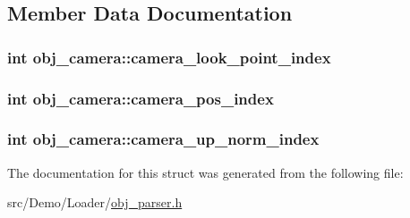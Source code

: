 \subsection{Member Data Documentation}
\hypertarget{structobj__camera_ad795a90bb5ddd7298fac17af40317881}{
\subsubsection[{camera\+\_\+look\+\_\+point\+\_\+index}]{\setlength{\rightskip}{0pt plus 5cm}int obj\+\_\+camera\+::camera\+\_\+look\+\_\+point\+\_\+index}}\label{structobj__camera_ad795a90bb5ddd7298fac17af40317881}
\hypertarget{structobj__camera_a02c5e1c127fc81b0377d773572d82a8a}{
\subsubsection[{camera\+\_\+pos\+\_\+index}]{\setlength{\rightskip}{0pt plus 5cm}int obj\+\_\+camera\+::camera\+\_\+pos\+\_\+index}}\label{structobj__camera_a02c5e1c127fc81b0377d773572d82a8a}
\hypertarget{structobj__camera_a2d8ae90adcf03df3b2b28c3c13e1da5d}{
\subsubsection[{camera\+\_\+up\+\_\+norm\+\_\+index}]{\setlength{\rightskip}{0pt plus 5cm}int obj\+\_\+camera\+::camera\+\_\+up\+\_\+norm\+\_\+index}}\label{structobj__camera_a2d8ae90adcf03df3b2b28c3c13e1da5d}


The documentation for this struct was generated from the following file\+:\begin{DoxyCompactItemize}
\item 
src/\+Demo/\+Loader/\hyperlink{obj__parser_8h}{obj\+\_\+parser.\+h}\end{DoxyCompactItemize}
